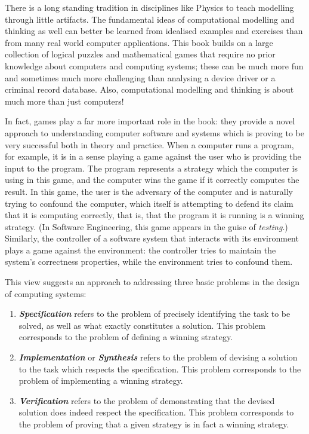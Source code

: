 \documentclass[sigconf]{acmart}
\newcommand{\bfit}[1]{\textbf{\textit{#1}}}
\begin{document}
There is a long standing tradition in disciplines like Physics to
teach modelling through little artifacts. The fundamental ideas of
computational modelling and thinking as well can better be learned
from idealised examples and exercises than from many real world
computer applications. This book builds on a large collection of
logical puzzles and mathematical games that require no prior knowledge
about computers and computing systems; these can be much more fun and
sometimes much more challenging than analysing a device driver or a
criminal record database. Also, computational modelling and thinking
is about much more than just computers!

In fact, games play a far more important role in the book: they
provide a novel approach to understanding computer software and
systems which is proving to be very successful both in theory and
practice.  When a computer runs a program, for example, it is in a
sense playing a game against the user who is providing the input to
the program. The program represents a strategy which the computer is
using in this game, and the computer wins the game if it correctly
computes the result. In this game, the user is the adversary of the
computer and is naturally trying to confound the computer, which
itself is attempting to defend its claim that it is computing
correctly, that is, that the program it is running is a winning
strategy.  (In Software Engineering, this game appears in the guise of
\emph{testing}.)  Similarly, the controller of a software system that
interacts with its environment plays a game against the environment:
the controller tries to maintain the system's correctness properties,
while the environment tries to confound them.

This view suggests an approach to addressing three basic problems in
the design of computing systems:

\begin{enumerate}
\item \bfit{Specification} refers to the problem of precisely
identifying the task to be solved, as well as what exactly constitutes
a solution. This problem corresponds to the problem of defining a
winning strategy.
\item \bfit{Implementation} or \bfit{Synthesis} refers to the problem
of devising a solution to the task which respects the specification.
This problem corresponds to the problem of implementing a winning
strategy.
\item \bfit{Verification} refers to the problem of demonstrating that
the devised solution does indeed respect the specification.  This
problem corresponds to the problem of proving that a given strategy is
in fact a winning strategy.
\end{enumerate}
\end{document}
